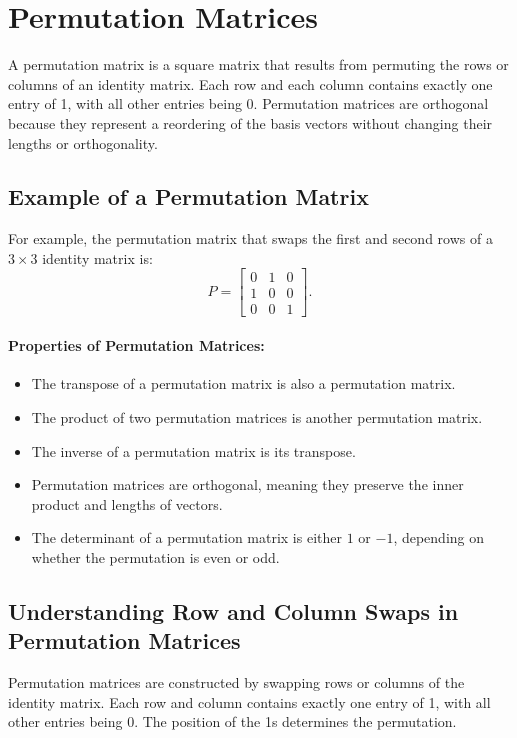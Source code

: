 \documentclass{article}
\begin{document}
\section*{Permutation Matrices}
A permutation matrix is a square matrix that results from permuting the rows or columns of an identity matrix. Each row and each column contains exactly one entry of 1, with all other entries being 0. Permutation matrices are orthogonal because they represent a reordering of the basis vectors without changing their lengths or orthogonality.

\subsection*{Example of a Permutation Matrix}
For example, the permutation matrix that swaps the first and second rows of a $3 \times 3$ identity matrix is:
\[P = \begin{bmatrix}
0 & 1 & 0 \\
1 & 0 & 0 \\
0 & 0 & 1
\end{bmatrix}.\]

\paragraph{Properties of Permutation Matrices:}
\begin{itemize}
    \item The transpose of a permutation matrix is also a permutation matrix.
    \item The product of two permutation matrices is another permutation matrix.
    \item The inverse of a permutation matrix is its transpose.
    \item Permutation matrices are orthogonal, meaning they preserve the inner product and lengths of vectors.
    \item The determinant of a permutation matrix is either $1$ or $-1$, depending on whether the permutation is even or odd.
\end{itemize}



\subsection*{Understanding Row and Column Swaps in Permutation Matrices}
Permutation matrices are constructed by swapping rows or columns of the identity matrix. Each row and column contains exactly one entry of 1, with all other entries being 0. The position of the 1s determines the permutation.
\end{document}
